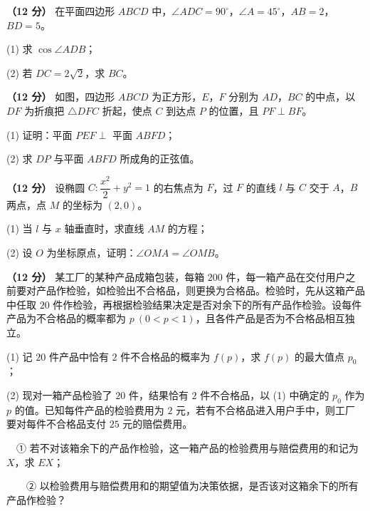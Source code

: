 \begin{question}
\textbf{（12 分）} 在平面四边形 $ABCD$ 中，$\angle ADC=90^\circ$，$\angle A=45^\circ$，$AB=2$，$BD=5$。

  (1) 求 $\cos\angle ADB$；

  (2) 若 $DC=2\sqrt2$，求 $BC$。

\Needspace{0.4\textheight}
\end{question}
\begin{question}
\textbf{（12 分）} 如图，四边形 $ABCD$ 为正方形，$E$，$F$ 分别为 $AD$，$BC$ 的中点，以 $DF$ 为折痕把 $\triangle DFC$ 折起，使点 $C$ 到达点 $P$ 的位置，且 $PF\perp BF$。
\nopagebreak[4]
\begin{center}\end{center}
\nopagebreak[4]
  (1) 证明：平面 $PEF\perp$ 平面 $ABFD$；

  (2) 求 $DP$ 与平面 $ABFD$ 所成角的正弦值。

\end{question}
\begin{question}
\textbf{（12 分）} 设椭圆 $C:\dfrac{x^{2}}2+y^{2}=1$ 的右焦点为 $F$，过 $F$ 的直线 $l$ 与 $C$ 交于 $A$，$B$ 两点，点 $M$ 的坐标为 $(2,0)$。

  (1) 当 $l$ 与 $x$ 轴垂直时，求直线 $AM$ 的方程；

  (2) 设 $O$ 为坐标原点，证明：$\angle OMA=\angle OMB$。

\end{question}
\begin{question}
\textbf{（12 分）} 某工厂的某种产品成箱包装，每箱 $200$ 件，每一箱产品在交付用户之前要对产品作检验，如检验出不合格品，则更换为合格品。检验时，先从这箱产品中任取 $20$ 件作检验，再根据检验结果决定是否对余下的所有产品作检验。设每件产品为不合格品的概率都为 $p\ (0<p<1)$，且各件产品是否为不合格品相互独立。

  (1) 记 $20$ 件产品中恰有 $2$ 件不合格品的概率为 $f(p)$，求 $f(p)$ 的最大值点 $p_0$；

  (2) 现对一箱产品检验了 $20$ 件，结果恰有 $2$ 件不合格品，以 (1) 中确定的 $p_0$ 作为 $p$ 的值。已知每件产品的检验费用为 $2$ 元，若有不合格品进入用户手中，则工厂要对每件不合格品支付 $25$ 元的赔偿费用。

  　① 若不对该箱余下的产品作检验，这一箱产品的检验费用与赔偿费用的和记为 $X$，求 $EX$；

  　　② 以检验费用与赔偿费用和的期望值为决策依据，是否该对这箱余下的所有产品作检验？

\par\medskip

\Needspace{0.4\textheight}

\end{question}
